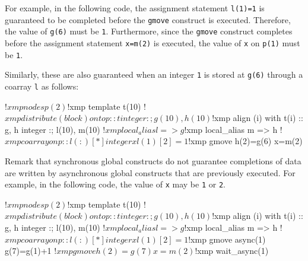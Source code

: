 For example, in the following code, the assignment statement \texttt{l(1)=1} is
guaranteed to be completed before the \texttt{gmove} construct is
executed.  Therefore, the value of \texttt{g(6)} must be \texttt{1}.
Furthermore, since the \texttt{gmove} construct completes before the
assignment statement \texttt{x=m(2)} is executed, the value of \texttt{x} on
\texttt{p(1)} must be \texttt{1}.
\begin{center}
\end{center}

Similarly, these are also guaranteed when an integer \texttt{1} is
stored at \texttt{g(6)} through a coarray \texttt{l} as follows:
\begin{center}
\begin{XFexample}
!$xmp nodes p(2)
!$xmp template t(10)
!$xmp distribute (block) onto p :: t
      integer :; g(10), h(10)
!$xmp align (i) with t(i) :: g, h
      integer :; l(10), m(10)
!$xmp local_alias l => g
!$xmp local_alias m => h
!$xmp coarray on p :: l(:)[*]
      integer x

      l(1)[2]=1
!$xmp gmove
      h(2)=g(6)
      x=m(2)
\end{XFexample}
\end{center}

Remark that synchronous global constructs do not guarantee completions
of data are written by asynchronous global constructs that are
previously executed.  For example, in the following code, the value of
\texttt{x} may be \texttt{1} or \texttt{2}.

\begin{center}
\begin{XFexample}
!$xmp nodes p(2)
!$xmp template t(10)
!$xmp distribute (block) onto p :: t
      integer :; g(10), h(10)
!$xmp align (i) with t(i) :: g, h
      integer :; l(10), m(10)
!$xmp local_alias l => g
!$xmp local_alias m => h
!$xmp coarray on p :: l(:)[*]
      integer x

      l(1)[2]=1
!$xmp gmove async(1)
      g(7)=g(1)+1
!$xmp gmove
      h(2)=g(7)
      x=m(2)
!$xmp wait_async(1)
\end{XFexample}
\end{center}

